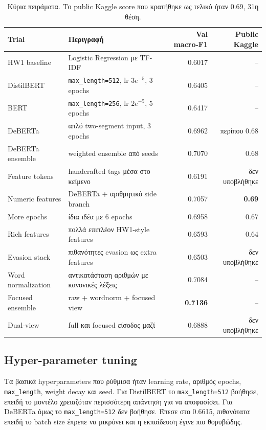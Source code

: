 \documentclass[12pt]{fphw}
\begin{document}
\begin{table}[H]
\centering
\small
\begin{tabularx}{\textwidth}{lXrr}
\toprule
Trial & Περιγραφή & Val macro-F1 & Public Kaggle \\
\midrule
HW1 baseline & Logistic Regression με TF-IDF & 0.6017 & -- \\
DistilBERT & \texttt{max\_length=512}, lr $3e^{-5}$, 3 epochs & 0.6405 & -- \\
BERT & \texttt{max\_length=256}, lr $2e^{-5}$, 5 epochs & 0.6417 & -- \\
DeBERTa & απλό two-segment input, 3 epochs & 0.6962 & περίπου 0.68 \\
DeBERTa ensemble & weighted ensemble από seeds & 0.7070 & 0.68 \\
Feature tokens & handcrafted tags μέσα στο κείμενο & 0.6191 & δεν υποβλήθηκε \\
Numeric features & DeBERTa + αριθμητικό side branch & 0.7057 & \textbf{0.69} \\
More epochs & ίδια ιδέα με 6 epochs & 0.6958 & 0.67 \\
Rich features & πολλά επιπλέον HW1-style features & 0.6593 & 0.64 \\
Evasion stack & πιθανότητες evasion ως extra features & 0.6503 & δεν υποβλήθηκε \\
Word normalization & αντικατάσταση αριθμών με κανονικές λέξεις & 0.7084 & -- \\
Focused ensemble & raw + wordnorm + focused view & \textbf{0.7136} & -- \\
Dual-view & full και focused είσοδος μαζί & 0.6888 & δεν υποβλήθηκε \\
\bottomrule
\end{tabularx}
\caption{Κύρια πειράματα. Το public Kaggle score που κρατήθηκε ως τελικό ήταν 0.69, 31η θέση.}
\label{tab:trials}
\end{table}

\subsection{Hyper-parameter tuning}

Τα βασικά hyperparameters που ρύθμισα ήταν learning rate, αριθμός epochs, \texttt{max\_length}, weight decay και seed. Για DistilBERT το \texttt{max\_length=512} βοήθησε, επειδή το μοντέλο χρειαζόταν περισσότερη απάντηση για να αποφασίσει. Για DeBERTa όμως το \texttt{max\_length=512} δεν βοήθησε. Έπεσε στο 0.6615, πιθανότατα επειδή το batch size έπρεπε να μικρύνει και η εκπαίδευση έγινε πιο θορυβώδης.
\end{document}
